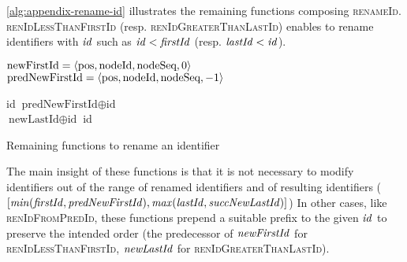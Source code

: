 \label{app:rename-id}

\autoref{alg:appendix-rename-id} illustrates the remaining functions composing \textsc{renameId}.
\textsc{renIdLessThanFirstId} (resp. \textsc{renIdGreaterThanLastId}) enables to rename identifiers with $\mathit{id}$ such as $\mathit{id} < \mathit{firstId}$ (resp. $\mathit{lastId} < \mathit{id}$).

\begin{algorithm}[!ht]
  \footnotesize
  \begin{algorithmic}[1]
      \Statex \Comment $\text{newFirstId} = \langle \text{pos},\text{nodeId},\text{nodeSeq},0 \rangle$
      \Statex \Comment $\text{predNewFirstId} = \langle \text{pos},\text{nodeId},\text{nodeSeq},-1 \rangle$

          \State \Return id
      \Else
          \State \Return $\text{predNewFirstId} \oplus \text{id}$
        \EndIf
      \EndFunction
      \\
              \State \Return $\text{newLastId} \oplus \text{id}$
          \Else
              \State \Return id
          \EndIf
      \EndFunction
  \end{algorithmic}
  \caption{Remaining functions to rename an identifier}
  \label{alg:appendix-rename-id}
\end{algorithm}

The main insight of these functions is that it is not necessary to modify identifiers out of the range of renamed identifiers and of resulting identifiers ($[\mathit{min}(\mathit{firstId}, \mathit{predNewFirstId}), \mathit{max}(\mathit{lastId}, \mathit{succNewLastId})]$)
%
In other cases, like \textsc{renIdFromPredId}, these functions prepend a suitable prefix to the given $\mathit{id}$ to preserve the intended order (the predecessor of $\mathit{newFirstId}$ for \textsc{renIdLessThanFirstId}, $\mathit{newLastId}$ for \textsc{renIdGreaterThanLastId}).
